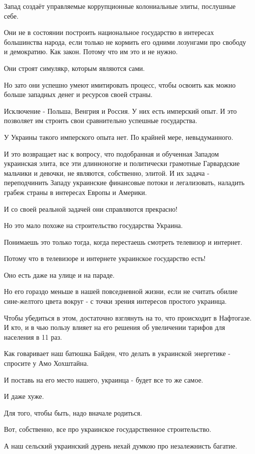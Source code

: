 Запад создаёт управляемые коррупционные колониальные элиты, послушные себе.

Они не в состоянии построить национальное государство в интересах большинства
народа, если только не кормить его одними лозунгами про свободу и демократию.
Как закон. Потому что им это и не нужно.

Они строят симулякр, которым являются сами.

Но зато они успешно умеют имитировать процесс, чтобы освоить как можно больше
западных денег и ресурсов своей страны.

Исключение - Польша, Венгрия и Россия. У них есть имперский опыт. И это
позволяет им строить свои сравнительно успешные государства.

У Украины такого имперского опыта нет. По крайней мере, невыдуманного.

И это возвращает нас к вопросу, что подобранная и обученная Западом украинская
элита, все эти длинноногие и политически грамотные Гарвардские мальчики и
девочки, не являются, собственно, элитой. И их задача - переподчинить Западу
украинские финансовые потоки и легализовать, наладить грабеж страны в интересах
Европы и Америки.

И со своей реальной задачей они справляются прекрасно!

Но это мало похоже на строительство государства Украина.

Понимаешь это только тогда, когда перестаешь смотреть телевизор и интернет.

Потому что в телевизоре и интернете украинское государство есть!

Оно есть даже на улице и на параде.

Но его гораздо меньше в нашей повседневной жизни, если не считать обилие
сине-желтого цвета вокруг - с точки зрения интересов простого украинца.

Чтобы убедиться в этом, достаточно взглянуть на то, что происходит в Нафтогазе.
И кто, и в чью пользу влияет на его решения об увеличении тарифов для населения
в 11 раз.

Как говаривает наш батюшка Байден, что делать в украинской энергетике -
спросите у Амо Хохштайна.

И поставь на его место нашего, украинца - будет все то же самое.

И даже хуже.

Для того, чтобы быть, надо вначале родиться.

Вот, собственно, все про украинское государственное строительство.

А наш сельский украинский дурень нехай думкою про незалежнисть багатие.
